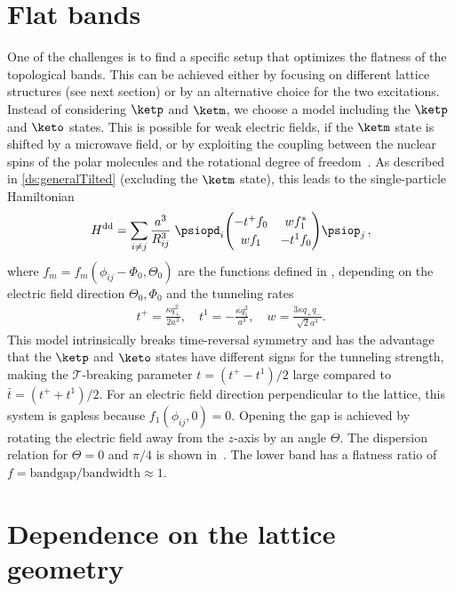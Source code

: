 \section{Flat bands}
One of the challenges is to find a specific setup that optimizes the flatness of the topological bands.
This can be achieved either by focusing on different lattice structures (see next section) or by an alternative choice for the two excitations.
Instead of considering $\ketp$ and $\ketm$, we choose a model including the $\ketp$ and $\keto$ states.
This is possible for weak electric fields, if the $\ketm$ state is shifted by a microwave field, or by exploiting the coupling between the nuclear spins of the polar molecules and the rotational degree of freedom~\cite{Ospelkaus2010,Yan2013}.
As described in \cref{ds:generalTilted} (excluding the $\ketm$ state), this leads to the single-particle Hamiltonian
\begin{align}
    H^{\text{dd}} = \sum_{i\ne j}
    \frac{a^3}{R_{ij}^3}\;
    \psiopd_i\!
    \begingroup
        \renewcommand*{\arraystretch}{1.2}
        \begin{pmatrix}
            -t^+ f_0 & w f_1^* \\
            w f_1    & -t^1 f_0
        \end{pmatrix}
    \endgroup\!
    \psiop_j \,,
\end{align}
where $f_m = f_m(\phi_{ij} - \Phi_0, \Theta_0)$ are the functions defined in , depending on the electric field direction $\Theta_0, \Phi_0$ and the tunneling rates
\begin{align}
    t^{+} = \frac{\kappa q_{+}^2}{2 a^3}, \quad
    t^{1} = -\frac{\kappa q_{1}^2}{a^3}, \quad
    w = \frac{3\kappa q_+ q_-}{\sqrt{2} a^3}.
\end{align}
This model intrinsically breaks time-reversal symmetry and has the advantage that the $\ketp$ and $\keto$ states have different signs for the tunneling strength, making the $\mathcal{T}$-breaking parameter $t=(t^+-t^1)/2$ large compared to $\bar{t}=(t^++t^1)/2$. %
For an electric field direction perpendicular to the lattice, this system is gapless because $f_1(\phi_{ij}, 0) = 0$.
Opening the gap is achieved by rotating the electric field away from the $z$-axis by an angle $\Theta$.
The dispersion relation for $\Theta=0$ and $\pi/4$ is shown in~.
The lower band has a flatness ratio of $f = \text{bandgap}/\text{bandwidth} \approx 1$.


\section{Dependence on the lattice geometry}

